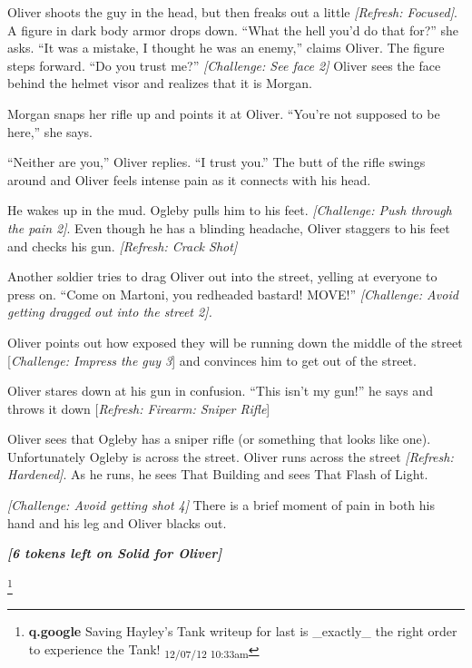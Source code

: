 Oliver shoots the guy in the head, but then freaks out a little \textit{{[}Refresh: Focused{]}}. A figure in dark body armor drops down. ``What the hell you'd do that for?'' she asks.  ``It was a mistake, I thought he was an enemy,'' claims Oliver.  The figure steps forward.  ``Do you trust me?''  \textit{{[}Challenge: See face 2{]}} Oliver sees the face behind the helmet visor and realizes that it is Morgan.



Morgan snaps her rifle up and points it at Oliver.  ``You're not supposed to be here,'' she says.

``Neither are you,'' Oliver replies.  ``I trust you.'' The butt of the rifle swings around and Oliver feels intense pain as it connects with his head.



He wakes up in the mud.  Ogleby pulls him to his feet. \textit{{[}Challenge: Push through the pain 2{]}}. Even though he has a blinding headache, Oliver staggers to his feet and checks his gun. \textit{{[}Refresh: Crack Shot{]}}



Another soldier tries to drag Oliver out into the street, yelling at everyone to press on.  ``Come on Martoni, you redheaded bastard!  MOVE!''  \textit{{[}Challenge: Avoid getting dragged out into the street 2{]}.  }



Oliver points out how exposed they will be running down the middle of the street {[}\textit{Challenge: Impress the guy 3}{]} and convinces him to get out of the street.  



Oliver stares down at his gun in confusion.  ``This isn't my gun!'' he says and throws it down {[}\textit{Refresh: Firearm: Sniper Rifle}{]}

Oliver sees that Ogleby has a sniper rifle (or something that looks like one).  Unfortunately Ogleby is across the street.  Oliver runs across the street \textit{{[}Refresh: Hardened{]}}.  As he runs, he sees That Building and sees That Flash of Light.



\textit{{[}Challenge: Avoid getting shot 4{]}} There is a brief moment of pain in both his hand and his leg and Oliver blacks out.



\textit{\textbf{{[}6 tokens left on Solid for Oliver{]}}}


\footnote{\textbf{q.google }Saving Hayley's Tank writeup for last is \_exactly\_ the right order to experience the Tank! \textsubscript{12/07/12 10:33am}}

